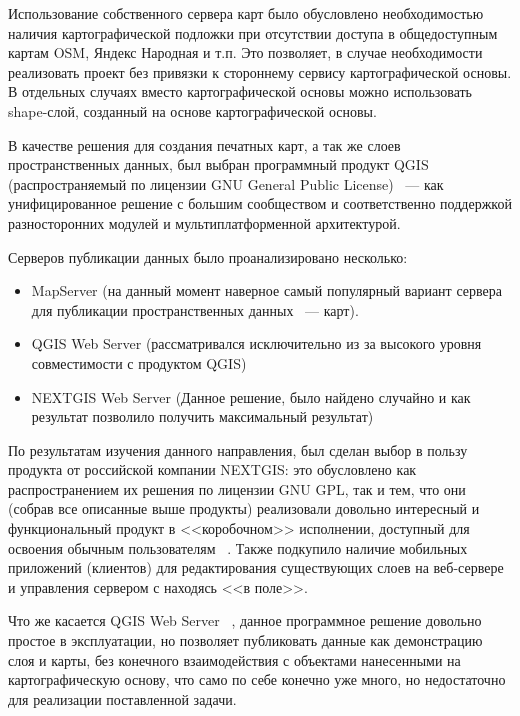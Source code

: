 \documentclass[10pt, a5paper]{article}
\begin{document}
Использование собственного сервера карт было обусловлено \linebreak необходимостью наличия картографической подложки при отсутствии доступа в общедоступным картам OSM, Яндекс Народная и т.п. Это позволяет, в случае необходимости реализовать проект без привязки к стороннему сервису картографической основы. В отдельных случаях вместо картографической основы можно использовать shape-слой,  созданный на основе картографической основы.

В качестве решения для создания печатных карт, а так же слоев пространственных данных, был выбран программный продукт QGIS ~\cite{Stepanov-1} (распространяемый по лицензии GNU General Public \linebreak License) ~--- как унифицированное решение с большим сообществом и соответственно поддержкой разносторонних модулей и мультиплатформенной архитектурой.

Серверов публикации данных было проанализировано несколько:

\begin{itemize}
  \item MapServer (на данный момент наверное самый популярный вариант сервера для публикации пространственных данных ~--- карт).
  \item QGIS Web Server (рассматривался исключительно из за высокого уровня совместимости с продуктом QGIS)
  \item NEXTGIS Web Server (Данное решение, было найдено случайно и как результат позволило получить максимальный результат)
\end{itemize}

По результатам изучения данного направления, был сделан выбор в пользу продукта от российской компании NEXTGIS: это обусловлено как распространением их решения по лицензии GNU GPL, так и тем, что они (собрав все описанные выше продукты) реализовали довольно интересный и функциональный продукт в <<коробочном>> исполнении, доступный для освоения обычным пользователям ~\cite{Stepanov-4}. Также подкупило наличие мобильных приложений (клиентов) для редактирования существующих слоев на веб-сервере и управления сервером с находясь <<в поле>>.

Что же касается QGIS Web Server ~\cite{Stepanov-5}, данное программное решение довольно простое в эксплуатации, но позволяет публиковать данные как демонстрацию слоя и карты, без конечного взаимодействия с объектами нанесенными на картографическую основу, что само по себе конечно уже много, но недостаточно для реализации поставленной задачи.
\end{document}
